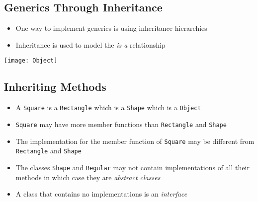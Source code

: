 
\Outline

\begin{slide}
\section[-1]{Generics Through Inheritance}

\begin{PauseHighLight}
  \begin{itemize}
  \item One way to implement generics is using inheritance hierarchies\pause
  \item Inheritance is used to model the \emph{is a} relationship
  \end{itemize}
  \begin{center}
    \texttt{[image: Object]}\pause
    \pauseb
  \end{center} 
\end{PauseHighLight}
\end{slide}


\begin{slide}
\section{Inheriting Methods}
\vspace{-2cm}
\begin{PauseHighLight}
  \begin{itemize}\squeeze
  \item A \texttt{Square} is a \texttt{Rectangle} which is a
    \texttt{Shape} which is a \texttt{Object}\pause
  \item \texttt{Square} may have more member functions than
    \texttt{Rectangle} and \texttt{Shape}\pause
  \item The implementation for the member function of \texttt{Square}
    may be different from \texttt{Rectangle} and \texttt{Shape}\pause
  \item The classes \texttt{Shape} and \texttt{Regular} may not contain
    implementations of all their methods in which case they are
    \emph{abstract classes}\pause
  \item A class that contains no implementations is an
    \emph{interface}\pause
  \end{itemize}
\end{PauseHighLight}

\end{slide}

